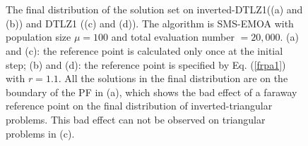 \documentclass[conference]{IEEEtran}
\begin{document}
\begin{figure}[!t]
  \centering
  \quad
  \\
  \quad
  \\
  \caption{The final distribution of the solution set on inverted-DTLZ1((a) and (b)) 
  and DTLZ1 ((c) and (d)).
  The algorithm is SMS-EMOA with population size $\mu= 100$ and total evaluation number $= 20,000$. 
  (a) and (c): the reference point is calculated only once at the initial step;
  (b) and (d): the reference point is specified by Eq. (\ref{frpa1}) with $r=1.1$.
  All the solutions in the final distribution are on the boundary of the PF in (a),
  which shows the bad effect of a faraway reference point
  on the final distribution of inverted-triangular problems. 
  This bad effect can not be observed on triangular problems in (c).
  }
  \label{rpa2}
\end{figure}
\end{document}
